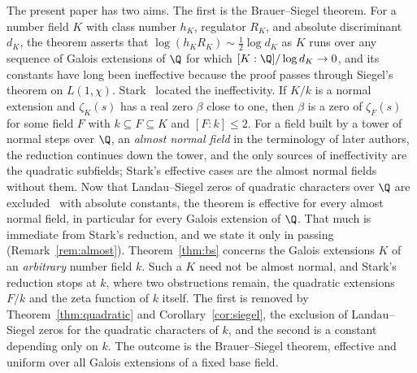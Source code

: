 \documentclass[11pt, reqno, twoside, letterpaper]{amsart}
\newcommand{\Kf}{K}
\begin{document}
The present paper has two aims. The first is the Brauer--Siegel
theorem. For a number field $\Kf$ with class number $h_\Kf$,
regulator $R_\Kf$, and absolute discriminant $d_\Kf$, the theorem
asserts that $\log(h_\Kf R_\Kf)\sim\tfrac12\log d_\Kf$ as $\Kf$ runs
over any sequence of Galois extensions of $\Q$ for which
$[\Kf:\Q]/\log d_\Kf\to 0$, and its constants have long been
ineffective because the proof passes through Siegel's theorem on
$L(1,\chi)$.
Stark~\cite{St} located the ineffectivity. If $\Kf/k$ is a normal
extension and $\zeta_\Kf(s)$ has a real zero $\beta$ close to one,
then $\beta$ is a zero of $\zeta_F(s)$ for some field $F$ with
$k\subseteq F\subseteq\Kf$ and $[F:k]\le 2$. For a field built by a
tower of normal steps over $\Q$, an \emph{almost normal field} in
the terminology of later authors, the reduction continues down the
tower, and the only
sources of ineffectivity are the quadratic subfields; Stark's
effective cases are the almost normal fields without them. Now that
Landau--Siegel zeros of quadratic characters over $\Q$ are
excluded~\cite{OAI,Gr,Ko} with absolute constants, the theorem is
effective for every almost normal field, in particular for every
Galois extension of $\Q$. That much is immediate from Stark's
reduction, and we state it only in passing (Remark~\ref{rem:almost}).
Theorem~\ref{thm:bs} concerns the Galois extensions $\Kf$ of an
\emph{arbitrary} number field $k$. Such a $\Kf$ need not be almost
normal,
and Stark's reduction stops at $k$, where two obstructions remain,
the quadratic extensions $F/k$ and the zeta function of $k$ itself.
The first is removed by Theorem~\ref{thm:quadratic} and
Corollary~\ref{cor:siegel}, the exclusion of Landau--Siegel zeros
for the quadratic characters of $k$, and the second is a constant
depending only on $k$. The outcome is the Brauer--Siegel theorem,
effective and uniform over all Galois extensions of a fixed base
field.
\end{document}

